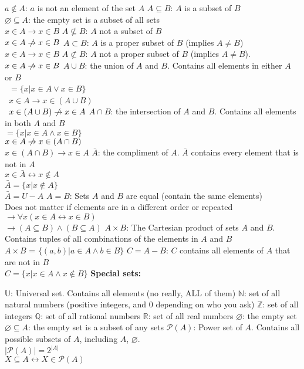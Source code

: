 \documentclass{article}
\newcommand{\upspace}{\vspace{0px}}
\newcommand{\bksp}{\hspace{-3px}}
\newcommand{\zza}[1]{\upspace \1\bksp\textbf{#1:}\addcontentsline{toc}{subsubsection}{#1}}
\newcommand{\aaa}{\upspace \1\bksp}
\newcommand{\bbb}{\upspace \2\bksp}
\renewcommand{\iff}{\leftrightarrow}
\renewcommand{\implies}{\rightarrow}
\begin{document}
\begin{multicols*}{2}
\begin{outline}[compactitem]
	\aaa $a \notin A$: $a$ is not an element of the set $A$
	\aaa $A \subseteq B  $:  $A$ is a subset of $B$
		\\ $\varnothing \subseteq A$: the empty set is a subset of all sets
		\\ $x \in A \implies x \in B$
	\aaa $A \nsubseteq B $:  $A$ not a subset of $B$
		\\ $x \in A \centernot\implies x \in B$
	\aaa $A \subset B    $:  $A$ is a proper subset of $B$ (implies $A\ne B$)
		\\ $x \in A \implies x \in B$
	\aaa $A \not\subset B$:  $A$ not a proper subset of $B$ (implies $A\ne B$).
		\\ $x \in A \centernot\implies x \in B$
	\aaa $A \cup B$: the union of $A$ and $B$. Contains all elements in either $A$ or $B$
		\\\ $= \{x|x \in A \vee x \in B\}$
		\\\ $x \in A \implies x \in (A \cup B)$
		\\\ $x \in (A \cup B) \centernot\implies x \in A $
	\aaa $A \cap B$: the intersection of $A$ and $B$. Contains all elements in both $A$ and $B$
		\\ $= \{x|x \in A \wedge x \in B\}$
		\\ $x \in A \centernot\implies x \in (A \cap B)$
		\\ $x \in (A \cap B) \implies x \in A $
	\aaa $\bar{A}$: the compliment of $A$. $\bar{A}$ contains every element that is not in $A$
		\\ $x \in \bar{A} \iff x \notin A$
		\\ $\bar{A} = \{x | x \notin A \}$
		\\ $\bar{A} = U - A$
	\aaa $A=B$: Sets $A$ and $B$ are equal (contain the same elements)
		\\ Does not matter if elements are in a different order or repeated
		\\ $\implies \forall x (x \in A \leftrightarrow x \in B)$
		\\ $\implies (A \subseteq B) \wedge (B \subseteq A)$
	\aaa $A \times B$: The Cartesian product of sets $A$ and $B$. Contains tuples of all combinations of the elements in $A$ and $B$
		\\ $A \times B$ = $\{(a,b) | a \in A \wedge b \in B\}$
	\aaa $C = A - B$:  $C$ contains all elements of $A$ that are not in $B$
		\\ $C = \{x|x \in A \wedge x \notin B \}$
	\zza{Special sets}
		\bbb $\mathbb{U}$: Universal set. Contains all elements (no really, ALL of them)
		\bbb $\mathbb{N}$: set of all natural numbers (positive integers, and 0 depending on who you ask)
		\bbb $\mathbb{Z}$: set of all integers
		\bbb $\mathbb{Q}$: set of all rational numbers
		\bbb $\mathbb{R}$: set of all real numbers
		\bbb $\varnothing$: the empty set
			\\ $\varnothing \subseteq A$: the empty set is a subset of any sets
		\bbb $\mathcal{P}(A)$: Power set of $A$. Contains all possible subsets of $A$, including $A$, $\varnothing$.
			\\ $|\mathcal{P}(A)| = 2^{|A|}$
			\\ $X \subseteq A \iff X \in \mathcal{P}(A)$


\end{outline}
\end{multicols*}
\end{document}
